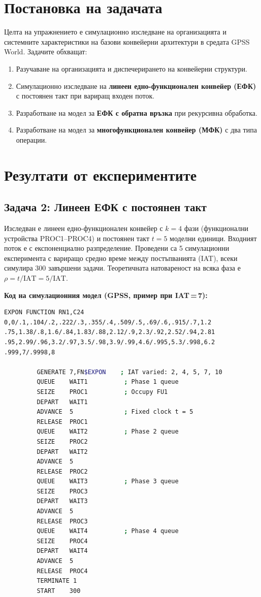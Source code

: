 
\section{Постановка на задачата}
Целта на упражнението е симулационно изследване на организацията и системните характеристики на базови конвейерни архитектури в средата GPSS World. Задачите обхващат:
\begin{enumerate}
    \item Разучаване на организацията и диспечерирането на конвейерни структури.
    \item Симулационно изследване на \textbf{линеен едно-функционален конвейер (ЕФК)} с постоянен такт при вариращ входен поток.
    \item Разработване на модел за \textbf{ЕФК с обратна връзка} при рекурсивна обработка.
    \item Разработване на модел за \textbf{многофункционален конвейер (МФК)} с два типа операции.
\end{enumerate}

\section{Резултати от експериментите}

\subsection{Задача 2: Линеен ЕФК с постоянен такт}

Изследван е линеен едно-функционален конвейер с $k = 4$ фази (функционални устройства PROC1--PROC4) и постоянен такт $t = 5$ моделни единици. Входният поток е с експоненциално разпределение. Проведени са 5 симулационни експеримента с вариращо средно време между постъпванията (IAT), всеки симулира 300 завършени задачи. Теоретичната натовареност на всяка фаза е $\rho = t / \mathrm{IAT} = 5 / \mathrm{IAT}$.

\textbf{Код на симулационния модел (GPSS, пример при IAT\,=\,7):}
\begin{lstlisting}[language=bash]
EXPON FUNCTION RN1,C24
0,0/.1,.104/.2,.222/.3,.355/.4,.509/.5,.69/.6,.915/.7,1.2
.75,1.38/.8,1.6/.84,1.83/.88,2.12/.9,2.3/.92,2.52/.94,2.81
.95,2.99/.96,3.2/.97,3.5/.98,3.9/.99,4.6/.995,5.3/.998,6.2
.999,7/.9998,8

         GENERATE 7,FN$EXPON    ; IAT varied: 2, 4, 5, 7, 10
         QUEUE    WAIT1          ; Phase 1 queue
         SEIZE    PROC1          ; Occupy FU1
         DEPART   WAIT1
         ADVANCE  5              ; Fixed clock t = 5
         RELEASE  PROC1
         QUEUE    WAIT2          ; Phase 2 queue
         SEIZE    PROC2
         DEPART   WAIT2
         ADVANCE  5
         RELEASE  PROC2
         QUEUE    WAIT3          ; Phase 3 queue
         SEIZE    PROC3
         DEPART   WAIT3
         ADVANCE  5
         RELEASE  PROC3
         QUEUE    WAIT4          ; Phase 4 queue
         SEIZE    PROC4
         DEPART   WAIT4
         ADVANCE  5
         RELEASE  PROC4
         TERMINATE 1
         START    300
\end{lstlisting}

